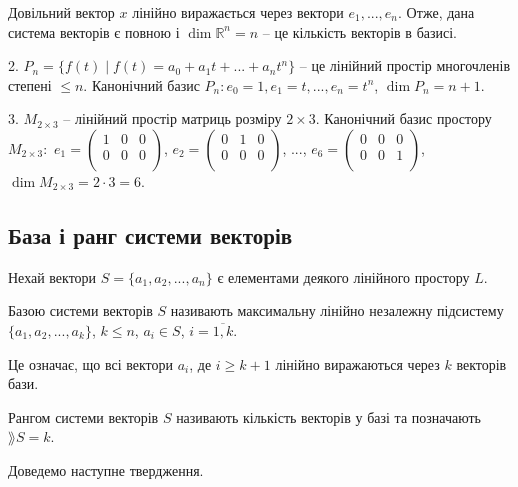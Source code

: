 \begin{example}
    Довільний вектор $x$ лінійно виражається через вектори $e_1, ..., e_n$. Отже, дана
    система векторів є повною і $\dim \mathbb{R}^n = n$ -- це кількість векторів в базисі.
    
    2. $P_n = \{f(t) \mid f(t) = a_0 + a_1t + ... + a_nt^n\}$ -- це лінійний простір многочленів
    степені $\leqslant n$. Канонічний базис $P_n: e_0=1, e_1=t, ..., e_n=t^n$, $\dim P_n = n+1$.
    
    3. $M_{2 \times 3}$ -- лінійний простір матриць розміру $2 \times 3$. Канонічний базис простору	
    $M_{2 \times 3}:$
    $e_1 = \begin{pmatrix}
        1 & 0 & 0 \\
        0 & 0 & 0 \\
    \end{pmatrix}$, $e_2 = \begin{pmatrix}
        0 & 1 & 0 \\
        0 & 0 & 0 \\
    \end{pmatrix}$, ..., $e_6 = \begin{pmatrix}
        0 & 0 & 0 \\
        0 & 0 & 1 \\
    \end{pmatrix}$, $\dim M_{2 \times 3} = 2 \cdot 3 = 6$.
\end{example}

\subsection{База і ранг системи векторів}  %

Нехай вектори $S = \{a_1, a_2, ..., a_n\}$ є елементами деякого лінійного простору $L$.

\begin{definition}
	Базою системи векторів $S$ називають максимальну лінійно незалежну
	підсистему $\{a_1, a_2, ..., a_k\}$, $k \leqslant n$, $a_i \in S$, $i = \overline{1,k}$.
\end{definition}

Це означає, що всі вектори $a_i$, де $i \geqslant k+1$ лінійно виражаються через $k$
векторів бази.

\begin{definition}
	Рангом системи векторів $S$ називають кількість векторів у базі та
	позначають $\rang S = k$.
\end{definition}

Доведемо наступне твердження.

